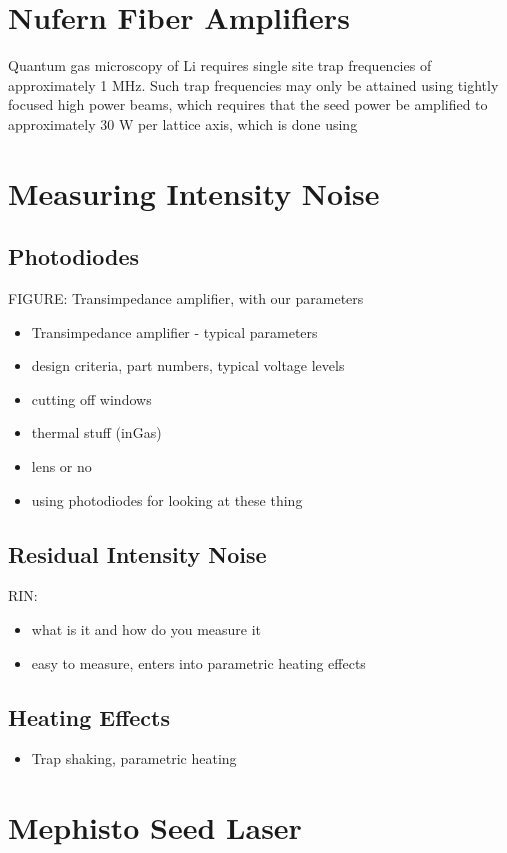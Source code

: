 \documentclass[twocolumn,aps,pra,showpacs,preprintnumbers,bibnotes]{revtex4-1}
\begin{document}
\section{Nufern Fiber Amplifiers}
Quantum gas microscopy of Li requires single site trap frequencies of approximately 1 MHz. 
Such trap frequencies may only be attained using tightly focused high power beams, which requires that the seed power be amplified to approximately 30 W per lattice axis, which is done using  

\section{Measuring Intensity Noise}
\subsection{Photodiodes}
FIGURE: Transimpedance amplifier, with our parameters
\begin{itemize}
	\item Transimpedance amplifier - typical parameters
	\item design criteria, part numbers, typical voltage levels
	\item cutting off windows
	\item thermal stuff (inGas)
	\item lens or no
	\item using photodiodes for looking at these thing
\end{itemize}

\subsection{Residual Intensity Noise}
RIN:
\begin{itemize}
\item what is it and how do you measure it
\item easy to measure, enters into parametric heating effects
\end{itemize}

\subsection{Heating Effects}
\begin{itemize}
	\item Trap shaking, parametric heating
\end{itemize}



\section{Mephisto Seed Laser}
\end{document}
